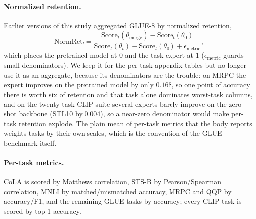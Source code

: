 \documentclass{article} %
\newcommand{\thetab}{\theta_0}
\begin{document}

\paragraph{Normalized retention.}
Earlier versions of this study aggregated GLUE-8 by normalized retention,
\begin{equation}
    \mathrm{NormRet}_t
    =
    \frac{
        \mathrm{Score}_t(\theta_{\mathrm{merge}})-\mathrm{Score}_t(\thetab)
    }{
        \mathrm{Score}_t(\theta_t)-\mathrm{Score}_t(\thetab)+\epsilon_{\mathrm{metric}}
    },
    \label{eq:normalized-retention}
\end{equation}
which places the pretrained model at $0$ and the task expert at $1$ ($\epsilon_{\mathrm{metric}}$ guards small denominators). We keep it for the per-task appendix tables but no longer use it as an aggregate, because its denominators are the trouble: on MRPC the expert improves on the pretrained model by only $0.168$, so one point of accuracy there is worth six of retention and that task alone dominates worst-task columns, and on the twenty-task CLIP suite several experts barely improve on the zero-shot backbone (STL10 by $0.004$), so a near-zero denominator would make per-task retention explode. The plain mean of per-task metrics that the body reports weights tasks by their own scales, which is the convention of the GLUE benchmark itself.

\paragraph{Per-task metrics.}
CoLA is scored by Matthews correlation, STS-B by Pearson/Spearman correlation, MNLI by matched/mismatched accuracy, MRPC and QQP by accuracy/F1, and the remaining GLUE tasks by accuracy; every CLIP task is scored by top-1 accuracy.
\end{document}

